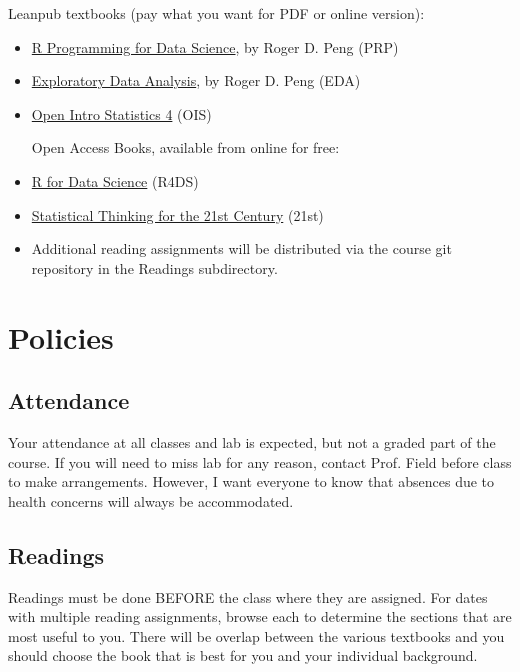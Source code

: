 \documentclass[11pt]{article} %
\begin{document}
  Leanpub textbooks (pay what you want for PDF or online version):

  \begin{itemize}  
    \item \href{https://leanpub.com/rprogramming}{R Programming for Data Science}, by Roger D. Peng (PRP)
  
    \item \href{https://leanpub.com/exdata}{Exploratory Data Analysis}, by Roger D. Peng (EDA) 
    
    \item \href{https://leanpub.com/openintro-statistics}{Open Intro Statistics 4} (OIS)  
  
  Open Access Books, available from online for free: 
  
    \item \href{http://r4ds.had.co.nz/}{R for Data Science} (R4DS)
    
    \item \href{https://statsthinking21.org/}{Statistical Thinking for the 21st Century} (21st)
  
    \item Additional reading assignments will be distributed via the course git repository in the Readings subdirectory. 
  \end{itemize}



\section{Policies}

  \subsection{Attendance}
  
    Your attendance at all classes and lab is expected, but not a graded part of the course. If you will need to miss lab for any reason, contact Prof. Field before class to make arrangements. However, I want everyone to know that absences due to health concerns will always be accommodated. 
  
  \subsection{Readings}
  
    Readings must be done BEFORE the class where they are assigned. For dates with multiple reading assignments, browse each to determine the sections that are most useful to you. There will be overlap between the various textbooks and you should choose the book that is best for you and your individual background.
  
\end{document}

